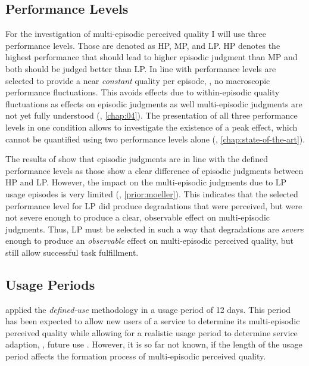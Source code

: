 \subsection{Performance Levels}
For the investigation of multi-episodic perceived quality I will use three performance levels.
Those are denoted as \acf{HP}, \acf{MP}, and \acf{LP}.
\ac{HP} denotes the highest performance that should lead to higher episodic judgment than \ac{MP} and both should be judged better than \ac{LP}.
In line with \citet{moller_single-call_2011} performance levels are selected to provide a near \emph{constant} quality per episode, \ie, no macroscopic performance fluctuations.
This avoids effects due to within-episodic quality fluctuations as effects on episodic judgments as well multi-episodic judgments are not yet fully understood (\cf, \autoref{chap:04}).
The presentation of all three performance levels in one condition allows to investigate the existence of a peak effect, which cannot be quantified using two performance levels alone (\cf, \autoref{chap:state-of-the-art}).

The results of \citet{moller_single-call_2011} show that episodic judgments are in line with the defined performance levels as those show a clear difference of episodic judgments between \ac{HP} and \ac{LP}.
However, the impact on the multi-episodic judgments due to \ac{LP} usage episodes is very limited (\cf, \autoref{prior:moeller}).
This indicates that the selected performance level for \ac{LP} did produce degradations that were perceived, but were not severe enough to produce a clear, observable effect on multi-episodic judgments.
Thus, \ac{LP} must be selected in such a way that degradations are \emph{severe} enough to produce an \emph{observable} effect on multi-episodic perceived quality, but still allow successful task fulfillment.

\subsection{Usage Periods}
\citet{moller_single-call_2011} applied the \emph{defined-use} methodology in a usage period of 12 days. 
This period has been expected to allow new users of a service to determine its multi-episodic perceived quality while allowing for a realistic usage period to determine service adaption, \ie, future use \citep[\cf,][]{moller_single-call_2011}.
However, it is so far not known, if the length of the usage period affects the formation process of multi-episodic perceived quality.

